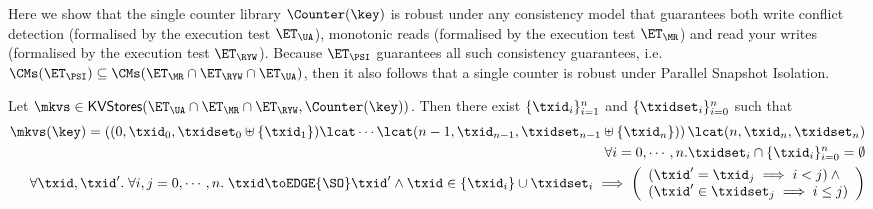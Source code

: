 Here we show that the  single counter library $\Counter(\key)$ is robust under any consistency model 
that guarantees both write conflict detection (formalised by the execution test 
$\ET_{\UA}$), monotonic reads (formalised by the execution test $\ET_{\MR}$) 
and read your writes (formalised by the execution test $\ET_{\RYW}$). 
Because $\ET_{\PSI}$ guarantees all such consistency guarantees, i.e. 
$\CMs(\ET_{\PSI}) \subseteq \CMs(\ET_{\MR} \cap \ET_{\RYW} \cap \ET_{\UA})$, 
then it also follows that a single counter is robust under Parallel Snapshot Isolation.
\begin{proposition}
\label{prop:counter_hhshape}
Let $\mkvs \in \mathsf{KVStores}(\ET_{\UA} \cap \ET_{\MR} \cap \ET_{\RYW}, \Counter(\key))$. 
Then there exist $\{\txid_i\}_{i = 1}^{n}$ and $\{\txidset_{i}\}_{i = 0}^{n}$ such that 
\begin{align}
\mkvs(\key) = \left( (0, \txid_{0}, \txidset_{0} \uplus \{\txid_1\}) \lcat \cdots \lcat (n-1, \txid_{n-1}, \txidset_{n-1} \uplus \{\txid_{n}\}) \right) 
\lcat (n, \txid_{n}, \txidset_{n}) \label{eq:psi_counter_shape}\\
\forall i=0,\cdots,n.\txidset_{i} \cap \{\txid_{i}\}_{i=0}^{n} = \emptyset \label{eq:psi_counter_rwtxs}\\
\forall \txid, \txid'.\;\forall i,j=0,\cdots, n.\; \txid \toEDGE{\SO} \txid' 
\wedge \txid \in \{\txid_{i}\} \cup \txidset_{i} \implies 
\left(\begin{array}{l}
(\txid' = \txid_{j} \implies i < j) \wedge {} \\
(\txid' \in \txidset_{j} \implies i \leq j) \\
\end{array}\right) \label{eq:psi_counter_so}
\end{align}
%
%
%
\end{proposition}

